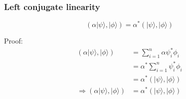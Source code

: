 \documentclass{article}
\begin{document}
\subsubsection{Left conjugate linearity}

\begin{equation}
    (\alpha|\psi\rangle,|\phi\rangle) = \alpha^*(|\psi\rangle,|\phi\rangle)
\end{equation}

Proof:
\begin{equation}
    \begin{split}
        (\alpha|\psi\rangle,|\phi\rangle) & = \sum_{i=1}^{n}\alpha\psi_i^*\phi_i \\
        & = \alpha^*\sum_{i=1}^{n}\psi_i^*\phi_i \\
        & = \alpha^*(|\psi\rangle,|\phi\rangle) \\
        \Longrightarrow (\alpha|\psi\rangle,|\phi\rangle) & = \alpha^*(|\psi\rangle,|\phi\rangle) \\
    \end{split}
\end{equation}
\end{document}
